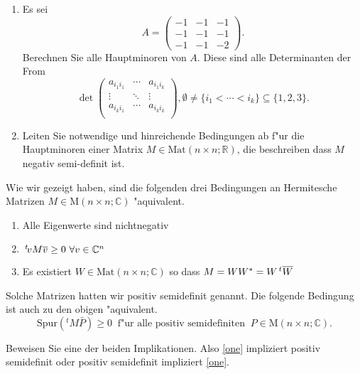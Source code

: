 \documentclass[a4,11pt]{article}
\begin{document}
\newpage

\begin{aufgabe}
\begin{enumerate}
\item
Es sei
\[
A =
\begin{pmatrix}
-1 & -1 & -1\\
-1 & -1 & -1 \\
-1 & -1 & -2
\end{pmatrix}.
\]
Berechnen Sie alle Hauptminoren von $A$. Diese sind alle Determinanten der From
\[
\det \begin{pmatrix} a_{i_1 i_1} & \cdots & a_{i_1 i_k} \\ \vdots & \ddots & \vdots \\ a_{i_k i_1} & \cdots & a_{i_k i_k} \\ \end{pmatrix}, \emptyset \neq \{ i_1  < \cdots < i_k \} \subseteq \{ 1, 2, 3\} .
\]
\item
Leiten Sie notwendige und hinreichende Bedingungen ab f"ur die Hauptminoren einer Matrix $M \in \text{Mat}(n \times n ; \mathbb{R})$, die beschreiben dass $M$ negativ semi-definit ist.
\end{enumerate}
\end{aufgabe}

\newpage

\begin{aufgabe}
  Wie wir gezeigt haben, sind die folgenden drei Bedingungen an
  Hermitesche Matrizen $M \in \text{M}(n\times n ; \mathbb{C})$ "aquivalent.
\begin{enumerate}
\item Alle Eigenwerte sind nichtnegativ
\item  $\transpose v M \overline{v} \geq 0 \ \forall v \in \mathbb{C}^n$
\item Es existiert $W \in \text{Mat}(n\times n ; \mathbb{C})$ so dass $M = W W^* = W \,^t\!\!\  \overline{W}$
\end{enumerate}
Solche Matrizen hatten wir positiv semidefinit genannt.
Die folgende Bedingung ist auch zu den obigen "aquivalent.
\begin{equation}
\label{one} \tag{4}
\text{Spur}(^t\!M\bar P) \geq 0 \ \text{ f"ur alle positiv
  semidefiniten } \ P \in  \text{M}(n\times n ; \mathbb{C}).
\end{equation}

Beweisen Sie eine der beiden Implikationen. Also \eqref{one} impliziert positiv semidefinit oder positiv semidefinit impliziert \eqref{one}.


\end{aufgabe}
\end{document}
